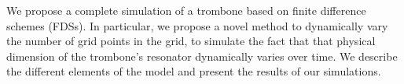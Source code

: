 We propose a complete simulation of a trombone based on finite difference schemes (FDSs). In particular, we propose a novel method to dynamically vary the number of grid points in the grid, to simulate the fact that that physical dimension of the trombone's resonator dynamically varies over time.
We describe the different elements of the model and present the results of our simulations.